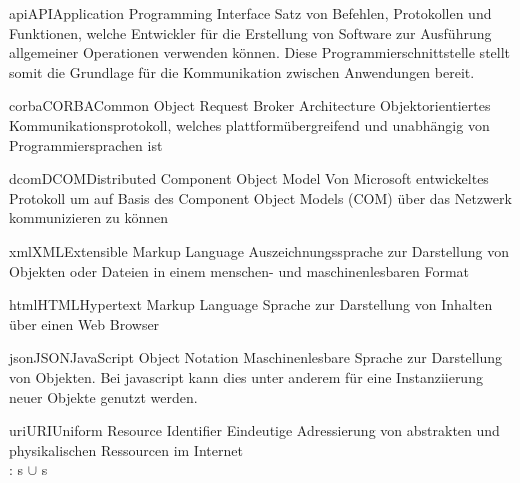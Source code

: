 


\newdefineabbreviation
{api}{API}{Application Programming Interface}
{Satz von Befehlen, Protokollen und Funktionen,
	welche Entwickler für die Erstellung von Software zur Ausführung
	allgemeiner Operationen verwenden können.
	Diese Programmierschnittstelle stellt somit die Grundlage
	für die Kommunikation zwischen Anwendungen bereit.}

\newdefineabbreviation
{corba}{CORBA}{Common Object Request Broker Architecture}
{Objektorientiertes Kommunikationsprotokoll,
	welches plattformübergreifend und unabhängig von Programmiersprachen ist}

\newdefineabbreviation
{dcom}{DCOM}{Distributed Component Object Model}
{Von Microsoft entwickeltes Protokoll um auf Basis des Component Object Models (COM)
	über das Netzwerk kommunizieren zu können}

\newdefineabbreviation
{xml}{XML}{Extensible Markup Language}
{Auszeichnungssprache zur Darstellung von Objekten oder Dateien in einem menschen-
und maschinenlesbaren Format}

\newdefineabbreviation
{html}{HTML}{Hypertext Markup Language}
{Sprache zur Darstellung von Inhalten über einen Web Browser}

\newdefineabbreviation
{json}{JSON}{JavaScript Object Notation}
{Maschinenlesbare Sprache zur Darstellung von Objekten.
Bei \gls{javascript} kann dies unter anderem für eine
Instanziierung neuer Objekte genutzt werden.}

\newdefineabbreviation
{uri}{URI}{Uniform Resource Identifier}
{Eindeutige Adressierung von abstrakten und
physikalischen Ressourcen im Internet\\
: s $\cup$ s}

